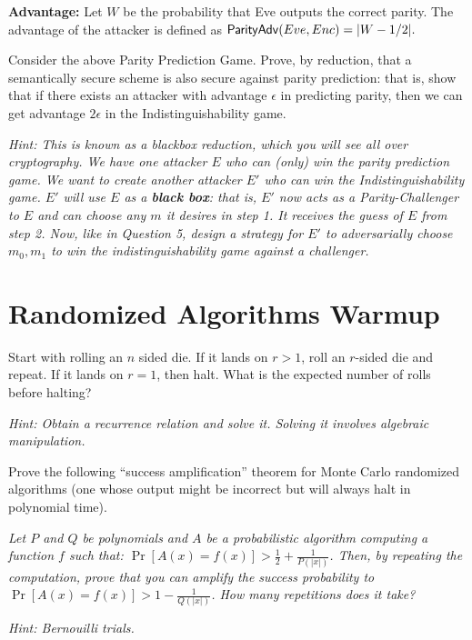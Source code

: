 \documentclass[10pt]{exam}
\begin{document}
\begin{questions}
{{                    \medskip
                    {\bf Advantage:} Let $W$ be the probability that Eve outputs the correct parity. The advantage of the attacker is defined as ${\sf ParityAdv}(Eve,Enc) = |W-1/2|.$
                }%
            }

\bigskip 

\question[5] Consider the above Parity Prediction Game. Prove, by reduction, that a semantically secure scheme is also secure against parity prediction: that is, show that if there exists an attacker with advantage $\epsilon$ in predicting parity, then we can get advantage $2\epsilon$ in the Indistinguishability game.

\textit{Hint: This is known as a blackbox reduction, which you will see all over cryptography. We have one attacker $E$ who can (only) win the parity prediction game. We want to create another attacker $E'$ who can win the Indistinguishability game. $E'$ will use $E$ as a {\bf black box}: that is, $E'$ now acts as a Parity-Challenger to $E$ and can choose any $m$ it desires in step 1. It receives the guess of $E$ from step 2.
Now, like in Question 5, design a strategy for $E'$ to adversarially choose $m_0,m_1$ to win the indistinguishability game against a challenger.}

\end{questions}

\section{Randomized Algorithms Warmup}

\begin{questions}

\question[4] Start with rolling an $n$ sided die. If it lands on $r>1$, roll an $r$-sided die and repeat. If it lands on $r=1$, then halt. What is the expected number of rolls before halting? 

\textit{Hint: Obtain a recurrence relation and solve it. Solving it involves algebraic manipulation.}

\question[3] Prove the following ``success amplification'' theorem for Monte Carlo randomized algorithms (one whose output might be incorrect but will always halt in polynomial time).

{\it Let $P$ and $Q$ be polynomials and $A$ be a probabilistic algorithm computing a function $f$ such that: $\Pr[A(x)=f(x)] > \frac{1}{2}+ \frac{1}{P(|x|)}$. Then, by repeating the computation, prove that you can amplify the success probability to $\Pr[A(x)=f(x)] > 1 - \frac{1}{Q(|x|)}$. How many repetitions does it take? }

\textit{Hint: Bernouilli trials.}

\end{questions} 
\end{document}
